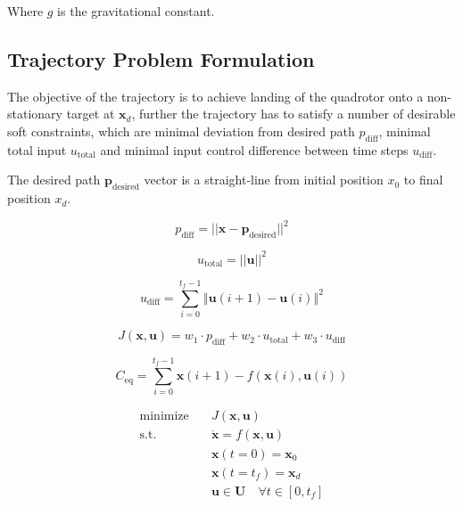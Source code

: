 \documentclass[letterpaper, 10 pt, conference]{ieeeconf}
\begin{document}
Where $g$ is the gravitational constant.

\subsection{Trajectory Problem Formulation}
The objective of the trajectory is to achieve landing of the quadrotor
onto a non-stationary target at $\textbf{x}_{d}$, further the trajectory
has to satisfy a number of desirable soft constraints, which are minimal
deviation from desired path $p_{\text{diff}}$, minimal total input
$u_{\text{total}}$ and minimal input control difference between time steps
$u_{\text{diff}}$.

The desired path $\textbf{p}_{\text{desired}}$ vector is a straight-line
from initial position $x_{0}$ to final position $x_{d}$. 

\begin{equation}
    p_{\text{diff}} = || \textbf{x} - \textbf{p}_{\text{desired}} ||^{2}
\end{equation}

\begin{equation}
    u_{\text{total}} = || \textbf{u} ||^{2}
\end{equation}

\begin{equation}
    u_{\text{diff}} = \sum_{i = 0}^{t_{f} - 1}
        \left\Vert
            \textbf{u}(i + 1) - \textbf{u}(i)
        \right\Vert^{2}
\end{equation}

\begin{equation}
    J(\textbf{x}, \textbf{u}) =
        w_{1} \cdot p_{\text{diff}}
        + w_{2} \cdot u_{\text{total}}
        + w_{3} \cdot u_{\text{diff}}
\end{equation}

\begin{equation}
  C_{\text{eq}} = \sum_{i = 0}^{t_{f} - 1}
    \textbf{x}(i + 1) - f(\textbf{x}(i), \textbf{u}(i))
\end{equation}

\begin{align}
  \text{minimize} \quad &J(\textbf{x}, \textbf{u}) \\
  \text{s.t.} \quad & \dot{\textbf{x}} = f(\textbf{x}, \textbf{u}) \\
    & \textbf{x}(t = 0) = \textbf{x}_{0} \\
    & \textbf{x}(t = t_{f}) = \textbf{x}_{d} \\
    & \textbf{u} \in \textbf{U} \quad \forall t \in [0, t_{f}]
\end{align}
\end{document}
